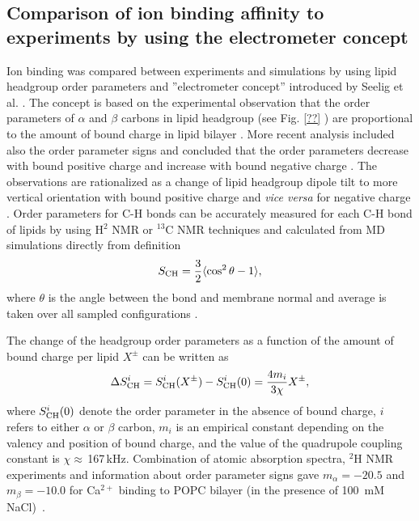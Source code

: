 \documentclass[aip,jcp,twocolumn]{revtex4}
\begin{document}
\subsection{Comparison of ion binding affinity to experiments by using the electrometer concept}
Ion binding was compared between experiments and simulations by 
using lipid headgroup order parameters and ''electrometer concept'' 
introduced by Seelig et al. \cite{seelig87,catte16}.
The concept is based on the experimental observation that the 
order parameters of $\alpha$ and $\beta$ carbons in lipid headgroup
(see Fig. \ref{??} 
) 
are proportional to the amount of bound charge
in lipid bilayer \cite{seelig87}.
More recent analysis included also
the order parameter signs and concluded that the order parameters  
decrease with bound positive charge and increase with bound negative 
charge \cite{ollila16,catte16}. The observations are rationalized 
as a change of lipid headgroup dipole tilt to more vertical orientation
with bound positive charge and {\it vice versa} for negative charge \cite{seelig87}. 
Order parameters for C-H bonds can be accurately measured for each
C-H bond of lipids by using H$^2$ NMR or $^{13}$C NMR techniques and
calculated from MD simulations directly from definition
\begin{equation}\label{OP}
S_{\rm CH}=\frac{3}{2}\langle \cos^2\theta -1 \rangle,
\end{equation}
where $\theta$ is the angle between the bond and membrane
normal and average is taken over all sampled configurations \cite{ollila16}.


The change of the headgroup order parameters as a function of
the amount of bound charge per lipid $X^\pm$ 
can be written as~\cite{ferreira16}
\begin{equation}\label{OPchangeEQ}
\Delta S_{\rm{CH}}^{i}= S_{\rm{CH}}^{i}(X^\pm)-S_{\rm{CH}}^{i}(0) =\frac{4m_i }{3\chi}X^\pm,
\end{equation}
where $S_{\rm{CH}}^{i}(0)$ denote the order parameter in the absence of bound charge,
$i$ refers to either $\alpha$ or $\beta$ carbon,
$m_i$ is an empirical constant depending on the valency and position of bound charge,
and the value of the quadrupole coupling constant is $\chi \approx$\,167\,kHz.
Combination of atomic absorption spectra, $^2$H NMR experiments
and information about order parameter signs gave
$m_\alpha=-20.5$  and $m_\beta=-10.0$ for Ca$^{2+}$ binding to POPC
bilayer (in the presence of 100~mM NaCl)~\cite{altenbach84,ollila16,catte16}.
\end{document}
